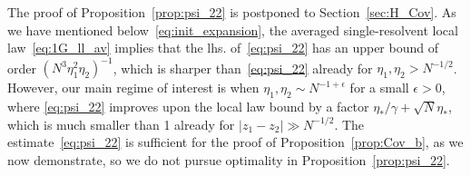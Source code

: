 \documentclass[10pt]{amsart}
\numberwithin{equation}{section}
\begin{document}
The proof of Proposition~\ref{prop:psi_22} is postponed to Section~\ref{sec:H_Cov}. As we have mentioned below~\eqref{eq:init_expansion}, the averaged single-resolvent local law~\eqref{eq:1G_ll_av} implies that the lhs. of~\eqref{eq:psi_22} has an upper bound of order $(N^3\eta_1^2\eta_2)^{-1}$, which is sharper than~\eqref{eq:psi_22} already for $\eta_1,\eta_2>N^{-1/2}$. However, our main regime of interest is when $\eta_1,\eta_2\sim N^{-1+\epsilon}$ for a small $\epsilon>0$, where \eqref{eq:psi_22} improves upon the local law bound by a factor $\eta_*/\gamma +\sqrt{N}\eta_*$, which is much smaller than 1 already for $|z_1-z_2|\gg N^{-1/2}$. The estimate~\eqref{eq:psi_22} is sufficient for the proof of Proposition~\ref{prop:Cov_b}, as we now demonstrate, so we do not pursue optimality in Proposition~\ref{prop:psi_22}.  
\end{document}
